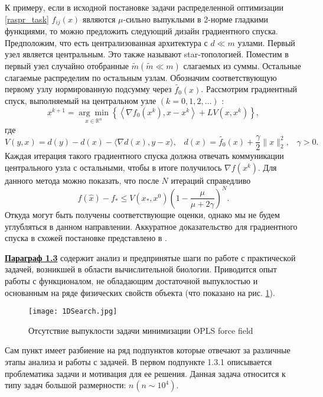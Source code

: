   К примеру, если в исходной постановке задачи распределенной оптимизации \eqref{raspr_task} $f_{ij}(x)$ являются $\mu$-сильно выпуклыми в 2-норме гладкими функциями, то можно предложить следующий дизайн градиентного спуска. Предположим, что есть централизованная архитектура с $d \ll m$ узлами. Первый узел является центральным. Это также называют star-топологией. Поместим в первый узел случайно отобранные $\tilde{m}(\widetilde{m} \ll m)$ слагаемых из суммы. Остальные слагаемые распределим по остальным узлам. Обозначим соответствующую первому узлу нормированную подсумму через $\widetilde{f_0}(x)$. Рассмотрим градиентный спуск, выполняемый на центральном узле $(k=0,1,2, \ldots)$ :
  $$
    x^{k+1}=\underset{x \in \mathbb{R}^n}{\arg \min }\left\{\left\langle\nabla f_0\left(x^k\right), x - x^k\right\rangle+L V\left(x, x^k\right)\right\},
  $$
  где
  $$
    V(y, x)=d(y)-d(x)-\langle\nabla d(x), y-x\rangle,\;\;\;d(x)=\widetilde{f_0}(x)+\frac{\gamma}{2}\|x\|_2^2, \;\;\; \gamma>0 .
  $$
  Каждая итерация такого градиентного спуска должна отвечать коммуникации центрального узла с остальными, чтобы в итоге получилось $\nabla f\left(x^k\right)$.
  Для данного метода можно показать, что после $N$ итераций справедливо
  $$
    f(\hat{x})-f_* \leqslant V\left(x_*, x^0\right)\left(1-\frac{\mu}{\mu+2 \gamma}\right)^N.
  $$
  Откуда могут быть получены соответствующие оценки, однако мы не будем углубляться в данном направлении. Аккуратное доказательство для градиентного спуска в схожей постановке представлено в \cite{distrib_relative}.

\underline{\textbf{Параграф 1.3}} содержит анализ и предпринятые шаги по работе с практической задачей, возникшей в области вычислительной биологии. Приводится опыт работы с функционалом, не обладающим достаточной выпуклостью и основанным на ряде физических свойств объекта (что показано на рис. \ref{fig1D}). 

\begin{figure}
\begin{center}
    \texttt{[image: 1DSearch.jpg]}
\end{center}
\caption{Отсутствие выпуклости задачи минимизации OPLS force field}
\label{fig1D}
\end{figure}
     
Сам пункт имеет разбиение на ряд подпунктов которые отвечают за различные этапы анализа и работы с задачей. В первом подпункте 1.3.1 описывается проблематика задачи и мотивация для ее решения. Данная задача относится к типу задач большой размерности:  $n_{ }\left(n\sim 10^4\right)$. 

